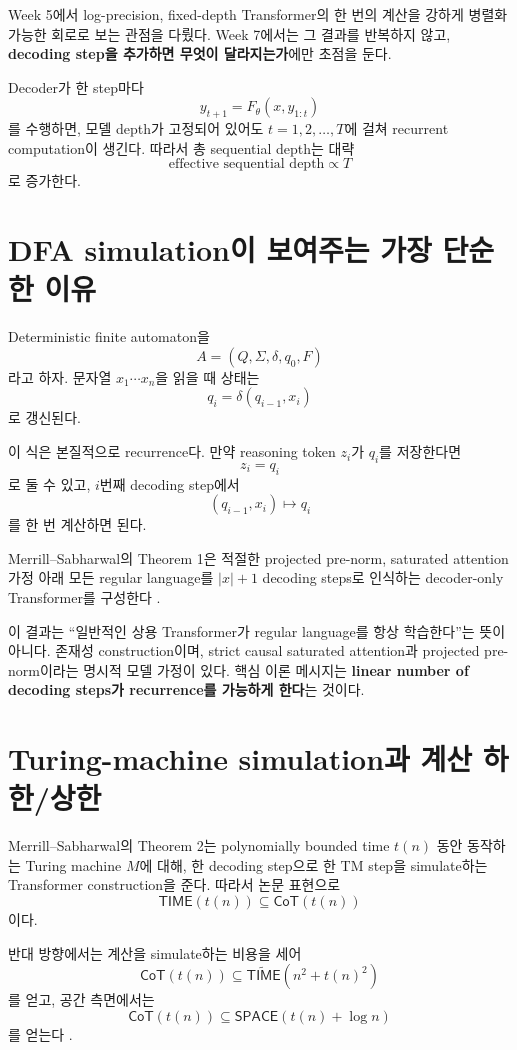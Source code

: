 \documentclass[11pt,a4paper,oneside,openany]{memoir}
\newcommand{\CoT}{\mathsf{CoT}}
\newcommand{\TIME}{\mathsf{TIME}}
\newcommand{\SPACE}{\mathsf{SPACE}}
\theoremstyle{definition}
\begin{document}
Week 5에서 log-precision, fixed-depth Transformer의 한 번의 계산을 강하게 병렬화 가능한 회로로 보는 관점을 다뤘다.
Week 7에서는 그 결과를 반복하지 않고, \textbf{decoding step을 추가하면 무엇이 달라지는가}에만 초점을 둔다.

Decoder가 한 step마다
\[
y_{t+1}=F_\theta(x,y_{1:t})
\]
를 수행하면, 모델 depth가 고정되어 있어도 $t=1,2,\ldots,T$에 걸쳐 recurrent computation이 생긴다.
따라서 총 sequential depth는 대략
\[
\text{effective sequential depth}
\propto T
\]
로 증가한다.

\section{DFA simulation이 보여주는 가장 단순한 이유}

Deterministic finite automaton을
\[
A=(Q,\Sigma,\delta,q_0,F)
\]
라고 하자. 문자열 $x_1\cdots x_n$을 읽을 때 상태는
\[
q_i=\delta(q_{i-1},x_i)
\]
로 갱신된다.

이 식은 본질적으로 recurrence다. 만약 reasoning token $z_i$가 $q_i$를 저장한다면
\[
z_i=q_i
\]
로 둘 수 있고, $i$번째 decoding step에서
\[
(q_{i-1},x_i)
\mapsto q_i
\]
를 한 번 계산하면 된다.

Merrill--Sabharwal의 Theorem 1은 적절한 projected pre-norm, saturated attention 가정 아래 모든 regular language를 $|x|+1$ decoding steps로 인식하는 decoder-only Transformer를 구성한다 \cite{merrill2024}.

\begin{paperbox}
이 결과는 ``일반적인 상용 Transformer가 regular language를 항상 학습한다''는 뜻이 아니다.
존재성 construction이며, strict causal saturated attention과 projected pre-norm이라는 명시적 모델 가정이 있다.
핵심 이론 메시지는 \textbf{linear number of decoding steps가 recurrence를 가능하게 한다}는 것이다.
\end{paperbox}

\section{Turing-machine simulation과 계산 하한/상한}

Merrill--Sabharwal의 Theorem 2는 polynomially bounded time $t(n)$ 동안 동작하는 Turing machine $M$에 대해, 한 decoding step으로 한 TM step을 simulate하는 Transformer construction을 준다.
따라서 논문 표현으로
\[
\TIME(t(n))\subseteq\CoT(t(n))
\]
이다.

반대 방향에서는 계산을 simulate하는 비용을 세어
\[
\CoT(t(n))
\subseteq
\widetilde{\TIME}\!\left(n^2+t(n)^2\right)
\]
를 얻고, 공간 측면에서는
\[
\CoT(t(n))
\subseteq
\SPACE\!\left(t(n)+\log n\right)
\]
를 얻는다 \cite{merrill2024}.
\end{document}
